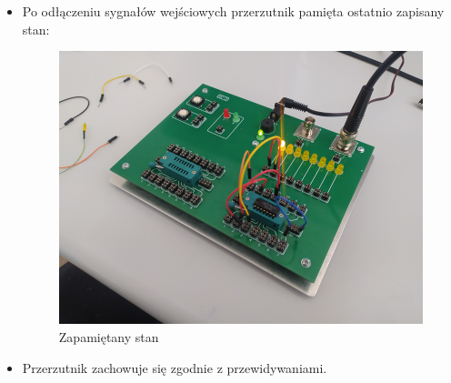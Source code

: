 \begin{itemize}
    \item Po odłączeniu sygnałów wejściowych przerzutnik pamięta ostatnio zapisany stan:
        \begin{figure}[H]
            \centering
            \includegraphics[width=\textwidth]{img/przerzutnik/1652306732331_scaled.png}
            \caption{Zapamiętany stan}
            \label{przerzutnik:pamietanie}
        \end{figure}
        
    \item Przerzutnik zachowuje się zgodnie z przewidywaniami.
\end{itemize}